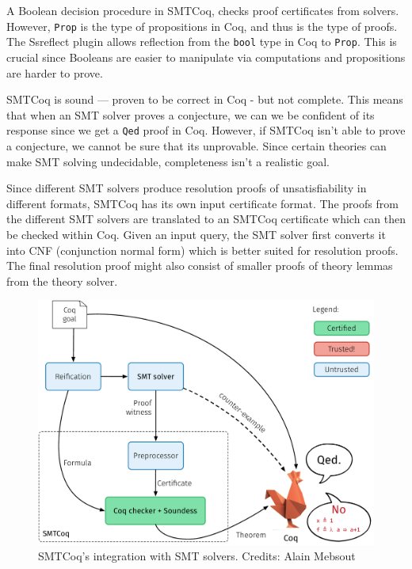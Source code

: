 \documentclass{article}
\begin{document}
	A Boolean decision procedure in SMTCoq, checks 
	proof certificates from solvers. However, 
	\texttt{Prop} is the type of propositions 
	in Coq, and thus is the type of proofs. 
	The Ssreflect plugin allows reflection from 
	the \texttt{bool} type in Coq to \texttt{Prop}.
	This is crucial since Booleans are easier to 
	manipulate via computations and propositions are 
	harder to prove.
	
	SMTCoq is sound --- proven to be correct in Coq 
	- but not complete. This means that when an 
	SMT solver proves a conjecture, we can we be 
	confident of its response since we get a 
	\texttt{Qed} proof in Coq. However, if 
	SMTCoq isn't able to prove a conjecture, 
	we cannot be sure that its unprovable.
	Since certain theories can make SMT 
	solving undecidable, completeness isn't a 
	realistic goal.	
	
	Since different SMT solvers produce resolution 
	proofs of unsatisfiability in different formats, 
	SMTCoq has its own input certificate format. 
	The proofs from the different SMT solvers are 
	translated to an SMTCoq certificate which 
	can then be checked within Coq. Given an input 
	query, the SMT solver first converts it into CNF
	(conjunction normal form) which is better 
	suited for resolution proofs. The final 
	resolution proof might also consist of smaller 
	proofs of theory lemmas from the theory solver. 
	
	\begin{figure}[t]
		\centering
		\includegraphics[scale=0.4]{tactic_cex.pdf}
		\caption{SMTCoq's integration with SMT solvers. Credits: Alain Mebsout}
		\label{fig:smtcoq}
	\end{figure}
	
\end{document}
